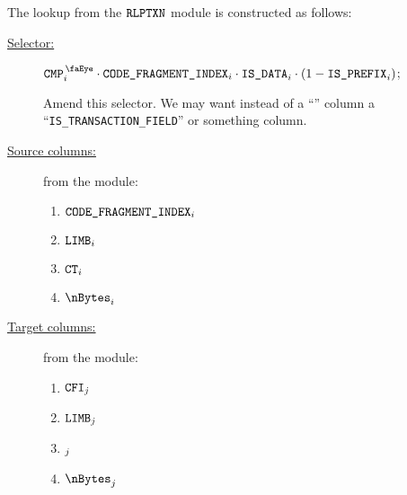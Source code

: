 The lookup from the $\texttt{RLPTXN}$ module is constructed as follows:
\begin{description}
	\item[\underline{Selector:}]
		$\isCmp _{i} \cdot \CFI{} _{i} \cdot \phaseData _{i} \cdot (1 - \rlpTxnSharedColumnIsPrefix _{i})$;

		\specTodo{}
		Amend this selector.
		We may want instead of a ``\rlpTxnSharedColumnIsPrefix{}''
		column a ``\texttt{IS\_TRANSACTION\_FIELD}'' or something column.
	\item[\underline{Source columns:}]
		from the \rlpTxnMod{} module:
	\begin{multicols}{3}
	\begin{enumerate}
		\item $\texttt{CODE\_FRAGMENT\_INDEX}{}  _{i}$
		\item $\texttt{LIMB}   _{i}$
		\item $\texttt{CT}     _{i}$
		\item $\nBytes _{i}$
	\end{enumerate}
	\end{multicols}
\item[\underline{Target columns:}] from the \romMod{} module: 
	\begin{multicols}{3}
	\begin{enumerate}
		\item $\texttt{CFI}    _{j}$
		\item $\texttt{LIMB}   _{j}$
		\item $\index  _{j}$
		\item $\nBytes _{j}$
	\end{enumerate} 
	\end{multicols}
\end{description}
